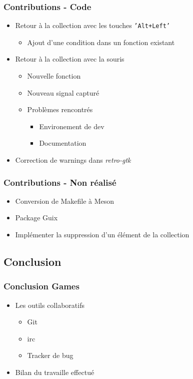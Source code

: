 \documentclass{beamer}
\begin{document}
\begin{frame}
  \frametitle{Contributions - Code}
  \begin{itemize}
  \item Retour à la collection avec les touches \texttt{'Alt+Left'}
    \begin{itemize}
    \item Ajout d'une condition dans un fonction existant
    \end{itemize}
  \item Retour à la collection avec la souris
    \begin{itemize}
    \item Nouvelle fonction
    \item Nouveau signal capturé
    \item Problèmes rencontrés
      \begin{itemize}
      \item Environement de dev
      \item Documentation
      \end{itemize}
    \end{itemize}
  \item Correction de warnings dans \textit{retro-gtk}
  \end{itemize}
\end{frame}

\begin{frame}
  \frametitle{Contributions - Non réalisé}
  \begin{itemize}
  \item Conversion de Makefile à Meson
  \item Package Guix
  \item Implémenter la suppression d'un élément de la collection
  \end{itemize}
\end{frame}


\subsection{Conclusion}
\begin{frame}
  \frametitle{Conclusion Games}
  \begin{itemize}
  \item Les outils collaboratifs
    \begin{itemize}
    \item Git 
    \item irc 
    \item Tracker de bug
    \end{itemize}
  \item Bilan du travaille effectué
  \end{itemize}
\end{frame}
\end{document}
